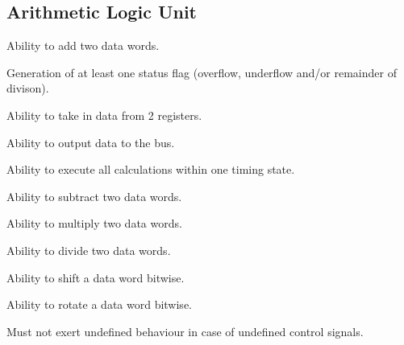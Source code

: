 \subsection{Arithmetic Logic Unit}

\begin{turing-requirement}
  Ability to add two data words.
\end{turing-requirement}

\begin{turing-requirement}
  Generation of at least one status flag (overflow, underflow and/or remainder of divison). 
\end{turing-requirement}

\begin{arch-requirement}
  Ability to take in data from 2 registers.
\end{arch-requirement}

\begin{arch-requirement}
  Ability to output data to the bus. 
\end{arch-requirement}

\begin{arch-requirement}
  Ability to execute all calculations within one timing state.
\end{arch-requirement}

\begin{feat-requirement}
  Ability to subtract two data words.
\end{feat-requirement}

\begin{feat-requirement}
  Ability to multiply two data words.
\end{feat-requirement}

\begin{feat-requirement}
  Ability to divide two data words.
\end{feat-requirement}

\begin{feat-requirement}
  Ability to shift a data word bitwise.
\end{feat-requirement}

\begin{feat-requirement}
  Ability to rotate a data word bitwise.
\end{feat-requirement}

\begin{feat-requirement}
  Must not exert undefined behaviour in case of undefined control signals. 
\end{feat-requirement}

